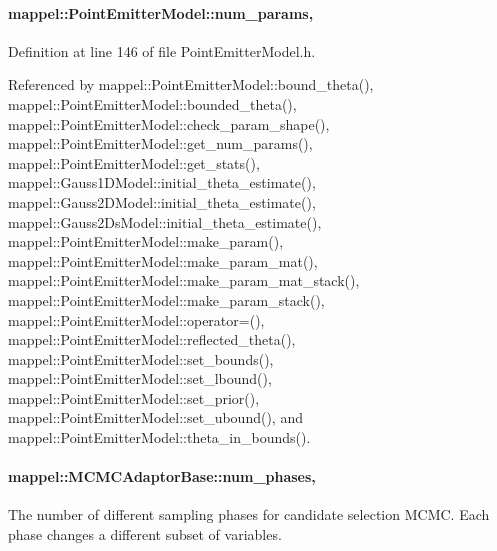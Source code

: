\paragraph[{\texorpdfstring{num\+\_\+params}{num_params}}]{ mappel\+::\+Point\+Emitter\+Model\+::num\+\_\+params\hspace{0.3cm}{\ttfamily [protected]}, {\ttfamily [inherited]}}\hypertarget{classmappel_1_1PointEmitterModel_a9af0484391bd6021ddc04ac666ab49ad}{}\label{classmappel_1_1PointEmitterModel_a9af0484391bd6021ddc04ac666ab49ad}


Definition at line 146 of file Point\+Emitter\+Model.\+h.



Referenced by mappel\+::\+Point\+Emitter\+Model\+::bound\+\_\+theta(), mappel\+::\+Point\+Emitter\+Model\+::bounded\+\_\+theta(), mappel\+::\+Point\+Emitter\+Model\+::check\+\_\+param\+\_\+shape(), mappel\+::\+Point\+Emitter\+Model\+::get\+\_\+num\+\_\+params(), mappel\+::\+Point\+Emitter\+Model\+::get\+\_\+stats(), mappel\+::\+Gauss1\+D\+Model\+::initial\+\_\+theta\+\_\+estimate(), mappel\+::\+Gauss2\+D\+Model\+::initial\+\_\+theta\+\_\+estimate(), mappel\+::\+Gauss2\+Ds\+Model\+::initial\+\_\+theta\+\_\+estimate(), mappel\+::\+Point\+Emitter\+Model\+::make\+\_\+param(), mappel\+::\+Point\+Emitter\+Model\+::make\+\_\+param\+\_\+mat(), mappel\+::\+Point\+Emitter\+Model\+::make\+\_\+param\+\_\+mat\+\_\+stack(), mappel\+::\+Point\+Emitter\+Model\+::make\+\_\+param\+\_\+stack(), mappel\+::\+Point\+Emitter\+Model\+::operator=(), mappel\+::\+Point\+Emitter\+Model\+::reflected\+\_\+theta(), mappel\+::\+Point\+Emitter\+Model\+::set\+\_\+bounds(), mappel\+::\+Point\+Emitter\+Model\+::set\+\_\+lbound(), mappel\+::\+Point\+Emitter\+Model\+::set\+\_\+prior(), mappel\+::\+Point\+Emitter\+Model\+::set\+\_\+ubound(), and mappel\+::\+Point\+Emitter\+Model\+::theta\+\_\+in\+\_\+bounds().

\paragraph[{\texorpdfstring{num\+\_\+phases}{num_phases}}]{ mappel\+::\+M\+C\+M\+C\+Adaptor\+Base\+::num\+\_\+phases\hspace{0.3cm}{\ttfamily [protected]}, {\ttfamily [inherited]}}\hypertarget{classmappel_1_1MCMCAdaptorBase_a44b90a984ace712584074dc17831fe25}{}\label{classmappel_1_1MCMCAdaptorBase_a44b90a984ace712584074dc17831fe25}
The number of different sampling phases for candidate selection M\+C\+MC. Each phase changes a different subset of variables. 

